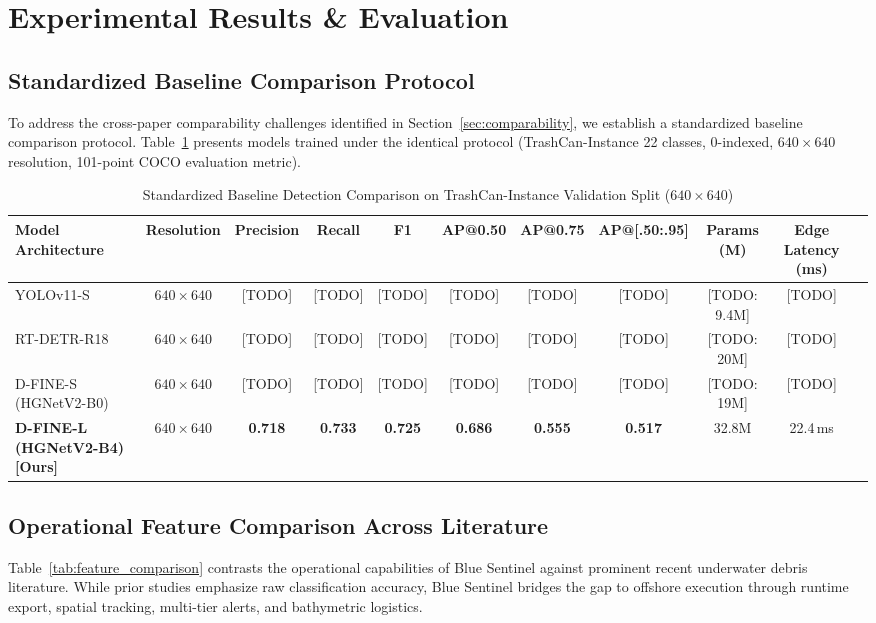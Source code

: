 \documentclass[conference]{IEEEtran}
\begin{document}
\section{Experimental Results \& Evaluation}

\subsection{Standardized Baseline Comparison Protocol}
To address the cross-paper comparability challenges identified in Section~\ref{sec:comparability}, we establish a standardized baseline comparison protocol. Table~\ref{tab:baseline_comparison} presents models trained under the identical protocol (TrashCan-Instance 22 classes, 0-indexed, $640\times640$ resolution, 101-point COCO evaluation metric).

\begin{table}[t]
\caption{Standardized Baseline Detection Comparison on TrashCan-Instance Validation Split ($640 \times 640$)}
\label{tab:baseline_comparison}
\centering
\begin{tabular}{lcccccccccc}
\toprule
\textbf{Model Architecture} & \textbf{Resolution} & \textbf{Precision} & \textbf{Recall} & \textbf{F1} & \textbf{AP@0.50} & \textbf{AP@0.75} & \textbf{AP@[.50:.95]} & \textbf{Params (M)} & \textbf{Edge Latency (ms)} \\
\midrule
YOLOv11-S \cite{yolo11_base} & $640 \times 640$ & [TODO] & [TODO] & [TODO] & [TODO] & [TODO] & [TODO] & [TODO: 9.4M] & [TODO] \\
RT-DETR-R18 \cite{rtdetr} & $640 \times 640$ & [TODO] & [TODO] & [TODO] & [TODO] & [TODO] & [TODO] & [TODO: 20M] & [TODO] \\
D-FINE-S (HGNetV2-B0) \cite{dfine} & $640 \times 640$ & [TODO] & [TODO] & [TODO] & [TODO] & [TODO] & [TODO] & [TODO: 19M] & [TODO] \\
\textbf{D-FINE-L (HGNetV2-B4) [Ours]} & $640 \times 640$ & \textbf{0.718} & \textbf{0.733} & \textbf{0.725} & \textbf{0.686} & \textbf{0.555} & \textbf{0.517} & 32.8M & 22.4\,ms \\
\bottomrule
\end{tabular}
\end{table}

\subsection{Operational Feature Comparison Across Literature}
Table~\ref{tab:feature_comparison} contrasts the operational capabilities of Blue Sentinel against prominent recent underwater debris literature. While prior studies emphasize raw classification accuracy, Blue Sentinel bridges the gap to offshore execution through runtime export, spatial tracking, multi-tier alerts, and bathymetric logistics.
\end{document}
